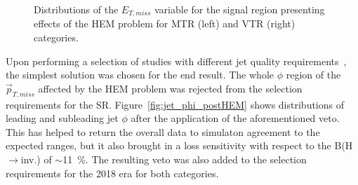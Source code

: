 \begin{figure}[htbp]
  \centering
  \caption{Distributions of the $E_{T,miss}$ variable for the signal region presenting effects of the HEM problem for MTR (left) and VTR (right) categories.  }
  \label{fig:hem_met}
\end{figure}



\hspace{10pt} Upon performing a selection of studies with different jet quality requirements~\cite{note:AN_19_257}, the simplest solution was chosen for the end result. The whole $\phi$ region of the $\vec{p}_{T, miss}$ affected by the HEM problem was rejected from the selection requirements for the SR. Figure~\ref{fig:jet_phi_postHEM} shows distributions of leading and subleading jet $\phi$ after the application of the aforementioned veto. This has helped to return the overall data to simulaton agreement to the expected ranges, but it also brought in a loss sensitivity with respect to the B(H$\rightarrow$inv.) of $\sim$11~\%. The resulting veto was also added to the selection requirements for the 2018 era for both categories.


